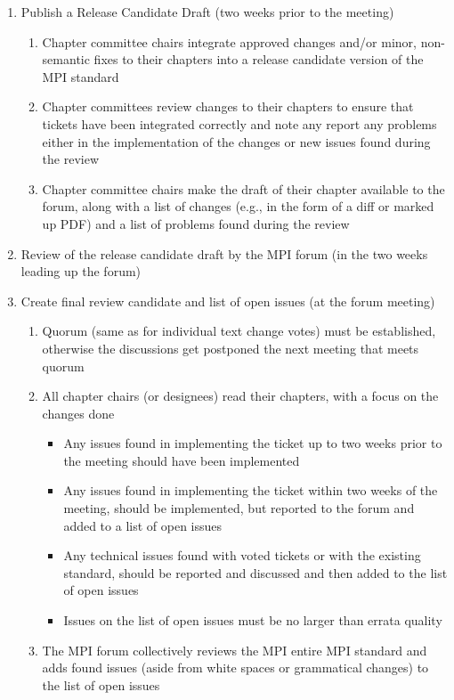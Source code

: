 \begin{enumerate}
\item Publish a Release Candidate Draft (two weeks prior to the meeting)
\begin{enumerate}
\item Chapter committee chairs integrate approved changes and/or minor, non-semantic fixes to their chapters into a release candidate version of the MPI standard
\item Chapter committees review changes to their chapters to ensure that tickets have been integrated correctly and note any report any problems either in the implementation of the changes or new issues found during the review
\item Chapter committee chairs make the draft of their chapter available to the forum, along with a list of changes (e.g., in the form of a diff or marked up PDF) and a list of problems found during the review
\end{enumerate}
\item Review of the release candidate draft by the MPI forum (in the two weeks leading up the forum)
\item Create final review candidate and list of open issues (at the forum meeting)
\begin{enumerate}
\item Quorum (same as for individual text change votes) must be established, otherwise the discussions get postponed the next meeting that meets quorum
\item All chapter chairs (or designees) read their chapters, with a focus on the changes done
\begin{itemize}
\item Any issues found in implementing the ticket up to two weeks prior to the meeting should have been implemented
\item Any issues found in implementing the ticket within two weeks of the meeting, should be implemented, but reported to the forum and added to a list of open issues
\item Any technical issues found with voted tickets or with the existing standard, should be reported and discussed and then added to the list of open issues
\item Issues on the list of open issues must be no larger than errata quality
\end{itemize}
\item The MPI forum collectively reviews the MPI entire MPI standard and adds found issues (aside from white spaces or grammatical changes) to the list of open issues 

\end{enumerate}
\end{enumerate}
